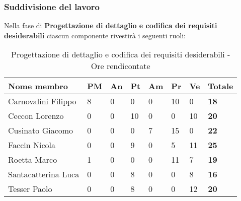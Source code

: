 		\subsubsection{Suddivisione del lavoro} %
		\label{ssub:suddivisione_del_lavoro}
		Nella fase di \textbf{Progettazione di dettaglio e codifica dei requisiti desiderabili} ciascun componente rivestirà i seguenti ruoli: \\
			\begin{table}[!ht]
				\begin{center}
					\begin{tabularx}{0.9\textwidth}{|l|l|l|l|l|l|l|X|}
						\hline
						\textbf{Nome membro} & \textbf{PM} & \textbf{An} & \textbf{Pt} & \textbf{Am} & \textbf{Pr} & \textbf{Ve} & \textbf{Totale} \\
						\hline
						Carnovalini Filippo & 8 & 0 & 0 & 0 & 10 & 0 & \textbf{18} \\
						\hline
						Ceccon Lorenzo & 0 & 0 & 10 & 0 & 0 & 10 & \textbf{20} \\
						\hline
						Cusinato Giacomo & 0 & 0 & 0 & 7 & 15 & 0 & \textbf{22} \\
						\hline
						Faccin Nicola & 0 & 0 & 9 & 0 & 5 & 11 & \textbf{25} \\
						\hline
						Roetta Marco & 1 & 0 & 0 & 0 & 11 & 7 & \textbf{19} \\
						\hline
						Santacatterina Luca & 0 & 0 & 8 & 0 & 0 & 8 & \textbf{16} \\
						\hline
						Tesser Paolo & 0 & 0 & 8 & 0 & 0 & 12 & \textbf{20} \\
						\hline	
					\end{tabularx}
				\end{center}
			\caption{Progettazione di dettaglio e codifica dei requisiti desiderabili - Ore rendicontate}
			\end{table}
			
